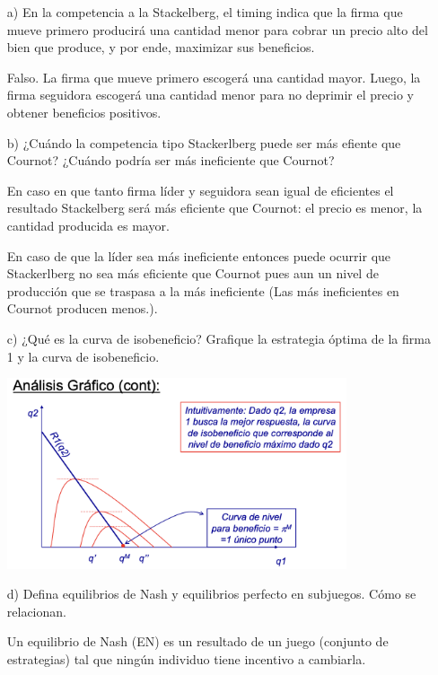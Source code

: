\documentclass{exam}
\begin{document}
\begin{itemize}
    \item[a)] En la competencia a la Stackelberg, el timing indica que la firma que mueve primero producirá una
    cantidad menor para cobrar un precio alto del bien que produce, y por ende, maximizar sus beneficios.
    \begin{solution}
        Falso. La firma que mueve primero escogerá una cantidad mayor. Luego, la firma seguidora escogerá una cantidad menor para no deprimir el precio y obtener beneficios positivos.
    \end{solution}
    \item[b)] ¿Cuándo la competencia tipo Stackerlberg puede ser más efiente que Cournot? ¿Cuándo podría ser más ineficiente que Cournot?
    \begin{solution}
        En caso en que tanto firma líder y seguidora sean igual de eficientes el resultado Stackelberg será más eficiente que Cournot: el precio es menor, la cantidad producida es mayor.

        En caso de que la líder sea más ineficiente entonces puede ocurrir que Stackerlberg no sea más eficiente que Cournot pues aun un nivel de producción que se traspasa a la más ineficiente (Las más ineficientes en Cournot producen menos.).
    \end{solution}
    \item[c)] ¿Qué es la curva de isobeneficio? Grafique la estrategia óptima de la firma 1 y la curva de isobeneficio.
    \begin{solution}
        \begin{center}
            \centering
            \includegraphics[width=10cm]{Captura de pantalla 2024-08-19 a la(s) 3.06.49 p. m..png}
        \end{center}
    \end{solution}

    \item[d)] Defina equilibrios de Nash y equilibrios perfecto en subjuegos. Cómo se relacionan.
    \begin{solution}
        Un equilibrio de Nash (EN) es un resultado de un juego (conjunto de estrategias) tal que ningún individuo tiene incentivo a cambiarla. 


\end{solution}
\end{itemize}
\end{document}
